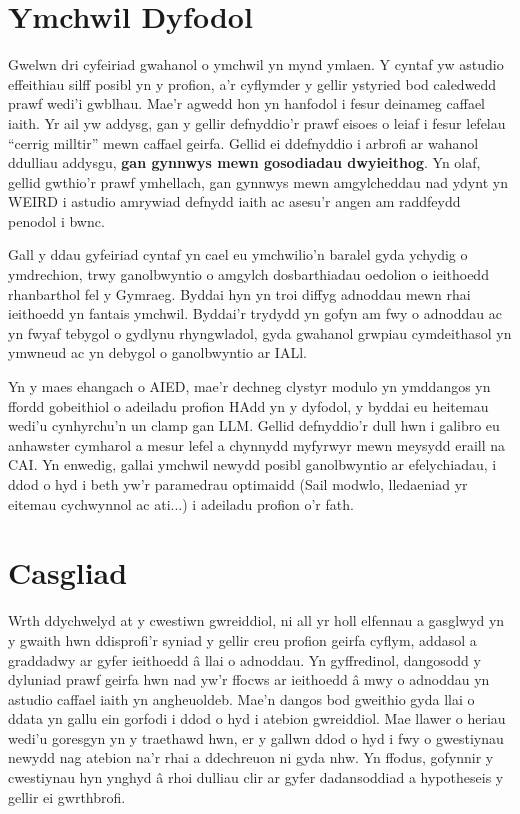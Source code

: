 \section{Ymchwil Dyfodol}
Gwelwn dri cyfeiriad gwahanol o ymchwil yn mynd ymlaen. Y cyntaf yw astudio effeithiau silff posibl yn y profion, a'r cyflymder y gellir ystyried bod caledwedd prawf wedi'i gwblhau. Mae'r agwedd hon yn hanfodol i fesur deinameg caffael iaith. Yr ail yw addysg, gan y gellir defnyddio'r prawf eisoes o leiaf i fesur lefelau ``cerrig milltir'' mewn caffael geirfa. Gellid ei ddefnyddio i arbrofi ar wahanol ddulliau addysgu, \textbf{gan gynnwys mewn gosodiadau dwyieithog}. Yn olaf, gellid gwthio'r prawf ymhellach, gan gynnwys mewn amgylcheddau nad ydynt yn WEIRD i astudio amrywiad defnydd iaith ac asesu'r angen am raddfeydd penodol i bwnc.

Gall y ddau gyfeiriad cyntaf yn cael eu ymchwilio'n baralel gyda ychydig o ymdrechion, trwy ganolbwyntio o amgylch dosbarthiadau oedolion o ieithoedd rhanbarthol fel y Gymraeg. Byddai hyn yn troi diffyg adnoddau mewn rhai ieithoedd yn fantais ymchwil. Byddai'r trydydd yn gofyn am fwy o adnoddau ac yn fwyaf tebygol o gydlynu rhyngwladol, gyda gwahanol grwpiau cymdeithasol yn ymwneud ac yn debygol o ganolbwyntio ar IALl.

Yn y maes ehangach o AIED, mae'r dechneg clystyr modulo yn ymddangos yn ffordd gobeithiol o adeiladu profion HAdd yn y dyfodol, y byddai eu heitemau wedi'u cynhyrchu'n un clamp gan LLM. Gellid defnyddio'r dull hwn i galibro eu anhawster cymharol a mesur lefel a chynnydd myfyrwyr mewn meysydd eraill na CAI. Yn enwedig, gallai ymchwil newydd posibl ganolbwyntio ar efelychiadau, i ddod o hyd i beth yw'r paramedrau optimaidd (Sail modwlo, lledaeniad yr eitemau cychwynnol ac ati...) i adeiladu profion o'r fath.

\section{Casgliad}
Wrth ddychwelyd at y cwestiwn gwreiddiol, ni all yr holl elfennau a gasglwyd yn y gwaith hwn ddisprofi'r syniad y gellir creu profion geirfa cyflym, addasol a graddadwy ar gyfer ieithoedd â llai o adnoddau. Yn gyffredinol, dangosodd y dyluniad prawf geirfa hwn nad yw'r ffocws ar ieithoedd â mwy o adnoddau yn astudio caffael iaith yn angheuoldeb. Mae'n dangos bod gweithio gyda llai o ddata yn gallu ein gorfodi i ddod o hyd i atebion gwreiddiol. Mae llawer o heriau wedi'u goresgyn yn y traethawd hwn, er y gallwn ddod o hyd i fwy o gwestiynau newydd nag atebion na'r rhai a ddechreuon ni gyda nhw. Yn ffodus, gofynnir y cwestiynau hyn ynghyd â rhoi dulliau clir ar gyfer dadansoddiad a hypotheseis y gellir ei gwrthbrofi.

